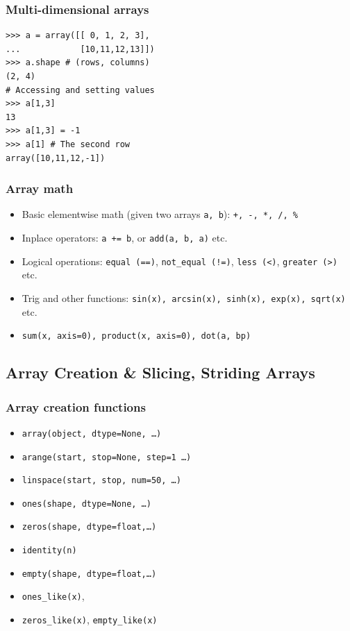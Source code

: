 \documentclass[14pt,compress]{beamer}
\newcounter{time}
\newcommand{\inctime}[1]{\addtocounter{time}{#1}{\tiny \thetime\ m}}
\newcommand{\typ}[1]{\texttt{#1}}
\begin{document}

\begin{frame}[fragile]
  \frametitle{Multi-dimensional arrays}
\begin{lstlisting}
>>> a = array([[ 0, 1, 2, 3],
...            [10,11,12,13]])
>>> a.shape # (rows, columns)
(2, 4)
# Accessing and setting values
>>> a[1,3] 
13
>>> a[1,3] = -1
>>> a[1] # The second row
array([10,11,12,-1])

\end{lstlisting}
\end{frame}
\begin{frame}[fragile]
  \frametitle{Array math}
  \begin{itemize}
  \item Basic \alert{elementwise} math (given two arrays \typ{a, b}):
      \typ{+, -, *, /, \%}
  \item Inplace operators: \typ{a += b}, or \typ{add(a, b,
      a)} etc.
  \item Logical operations: \typ{equal (==)}, \typ{not\_equal (!=)},
    \typ{less (<)}, \typ{greater (>)} etc.
  \item Trig and other functions: \typ{sin(x), arcsin(x), sinh(x),
      exp(x), sqrt(x)} etc.
  \item \typ{sum(x, axis=0), product(x, axis=0), dot(a, bp)}   \inctime{10}
  \end{itemize}
\end{frame}

\subsection{Array Creation \& Slicing, Striding Arrays}
\begin{frame}[fragile]
  \frametitle{Array creation functions}
  \begin{itemize}
  \item \typ{array(object, dtype=None, \ldots)}
  \item \typ{arange(start, stop=None, step=1 \ldots)}
  \item \typ{linspace(start, stop, num=50, \ldots)}
  \item \typ{ones(shape, dtype=None, \ldots)}
  \item \typ{zeros(shape, dtype=float,\ldots)}
  \item \typ{identity(n)}
  \item \typ{empty(shape, dtype=float,\ldots)}
  \item \typ{ones\_like(x)}, 
  \item \typ{zeros\_like(x)}, \typ{empty\_like(x)}
  \end{itemize}
\end{frame}
\end{document}
